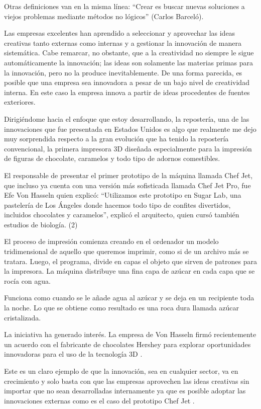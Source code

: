 \documentclass{bmcart}
\begin{document}
Otras definiciones van en la misma línea: “Crear es buscar nuevas soluciones a viejos problemas mediante métodos no lógicos” (Carlos Barceló).

Las empresas excelentes han aprendido a seleccionar y aprovechar las ideas creativas tanto externas como internas y a gestionar la innovación de manera sistemática. Cabe remarcar, no obstante, que a la creatividad no siempre le sigue automáticamente la innovación; las ideas son solamente las materias primas para la innovación, pero no la produce inevitablemente. De una forma parecida, es posible que una empresa sea innovadora a pesar de un bajo nivel de creatividad interna. En este caso la empresa innova a partir de ideas procedentes de fuentes exteriores. 

Dirigiéndome hacia el enfoque que estoy desarrollando, la repostería, una de las innovaciones que fue presentada en Estados Unidos es algo que realmente me dejo muy sorprendida respecto a la gran evolución que ha tenido la repostería convencional, la primera impresora 3D diseñada especialmente para la impresión de figuras de chocolate, caramelos y todo tipo de adornos comestibles.



El responsable de presentar el primer prototipo de la máquina llamada Chef Jet, que incluso ya cuenta con una versión más sofisticada llamada Chef Jet Pro, fue Efe Von Hasseln quien explicó: “Utilizamos este prototipo en Sugar Lab, una pastelería de Los Ángeles donde hacemos todo tipo de confites divertidos, incluidos chocolates y caramelos”, explicó el arquitecto, quien cursó también estudios de biología. (2)

El proceso de impresión comienza creando en el ordenador un modelo tridimensional de aquello que queremos imprimir, como si de un archivo más se tratara. Luego, el programa, divide en capas el objeto que sirven de patrones para la impresora. La máquina distribuye una fina capa de azúcar en cada capa que se rocía con agua.


Funciona como cuando se le añade agua al azúcar y se deja en un recipiente toda la noche. Lo que se obtiene como resultado es una roca dura llamada azúcar cristalizada.


La iniciativa ha generado interés. La empresa de Von Hasseln firmó recientemente un acuerdo con el fabricante de chocolates Hershey para explorar oportunidades innovadoras para el uso de la tecnología 3D .

Este es un claro ejemplo de que la innovación, sea en cualquier sector, va en crecimiento y solo basta con que las empresas aprovechen las ideas creativas sin importar que no sean desarrolladas internamente ya que es posible adoptar las innovaciones externas como es el caso del prototipo Chef Jet .
\end{document}
